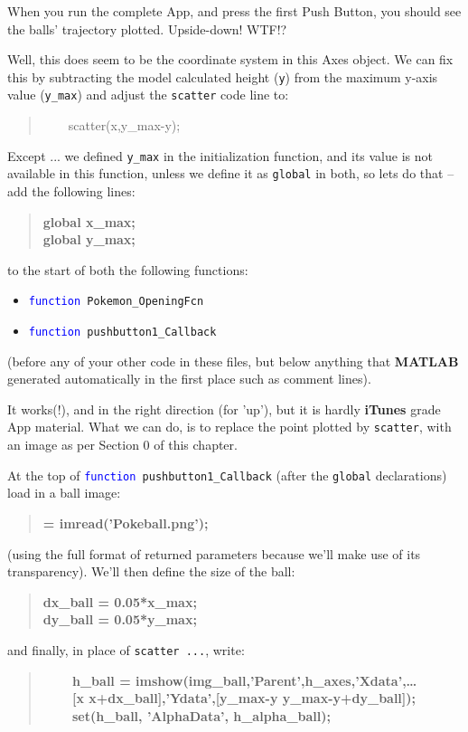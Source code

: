 \documentclass{tufte-book} %
\newenvironment{docspec}{\begin{quotation}\ttfamily\parskip0pt\parindent0pt\ignorespaces}{\end{quotation}}
\newenvironment{docspecbold}{\begin{quotation}\ttfamily\bfseries\parskip0pt\parindent0pt\ignorespaces}{\end{quotation}}
\begin{document}
When you run the complete App, and press the first \textsf{Push Button}, you should see the balls' trajectory plotted. Upside-down! WTF!?

Well, this does seem to be the coordinate system in this \textsf{Axes} object. We can fix this by subtracting the model calculated height (\texttt{y}) from the maximum y-axis value (\texttt{y\_max}) and adjust the \texttt{scatter} code line to:
\begin{docspec}
\ \ \ \    scatter(x,y\_max-y);
\end{docspec}
Except ... we defined \texttt{y\_max} in the initialization function, and its value is not available in this function, unless we define it as \texttt{global} in both, so lets do that -- add the following lines:
\begin{docspecbold}
global x\_max;
\\global y\_max;
\end{docspecbold}
to the start of both the following functions:
\begin{itemize}[noitemsep]
\setlength{\itemindent}{.2in}
\item \texttt{\textcolor{blue}{function} Pokemon\_OpeningFcn}
\item \texttt{\textcolor{blue}{function} pushbutton1\_Callback }
\end{itemize}
(before any of your other code in these files, but below anything that \textbf{MATLAB} generated automatically in the first place such as comment lines).

It works(!), and in the right direction (for 'up'), but it is hardly \textbf{iTunes} grade App material. What we can do, is to replace the point plotted by \texttt{scatter}, with an image as per Section \(0\) of this chapter.

At the top of \texttt{\textcolor{blue}{function} pushbutton1\_Callback} (after the \texttt{global} declarations) load in a ball image:
\begin{docspecbold}
[img\_ball, h\_map\_ball, h\_alpha\_ball] = imread('Pokeball.png');
\end{docspecbold}
(using the full format of returned parameters because we'll make use of its transparency). We'll then define the size of the ball:
\begin{docspecbold}
dx\_ball = 0.05*x\_max;
\\dy\_ball = 0.05*y\_max;
\end{docspecbold}
and finally, in place of \texttt{scatter ...}, write:
\begin{docspecbold}
\ \ \ \ h\_ball = imshow(img\_ball,'Parent',h\_axes,'Xdata',\ldots
\\ \ \ \ \ [x x+dx\_ball],'Ydata',[y\_max-y y\_max-y+dy\_ball]);
\\ \ \ \ \ set(h\_ball, 'AlphaData', h\_alpha\_ball);
\end{docspecbold}
\end{document}
